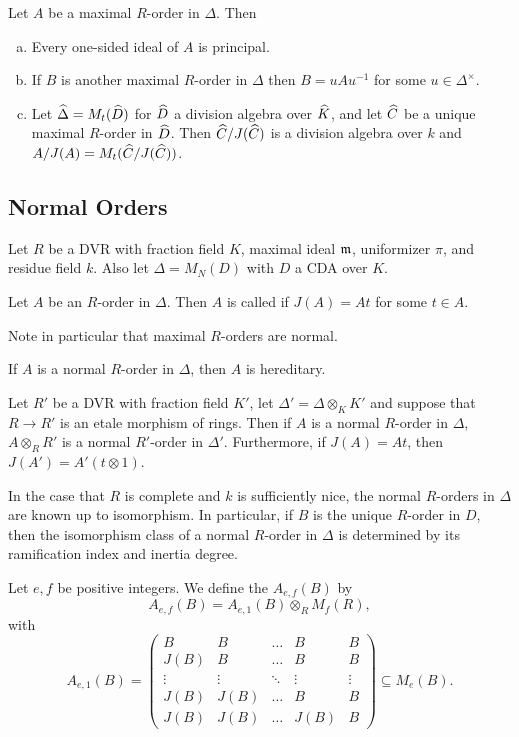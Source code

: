\begin{thm}
Let $A$ be a maximal $R$-order in $\Delta$.  Then
\begin{enumerate}[(a)]
\item  Every one-sided ideal of $A$ is principal.
\item  If $B$ is another maximal $R$-order in $\Delta$ then $B = uAu^{-1}$ for some $u\in \Delta^\times$.
\item  Let $\widehat\Delta = M_t(\widehat D)$ for $\widehat D$ a division algebra over $\widehat K$, and let $\widehat C$ be a unique maximal $R$-order in $\widehat D$.  Then $\widehat C/J(\widehat C)$ is a division algebra over $k$ and $A/J(A) = M_t(\widehat C/J(\widehat C))$.
\end{enumerate}
\end{thm}

\subsection{Normal Orders}
Let $R$ be a DVR with fraction field $K$, maximal ideal $\mathfrak{m}$, uniformizer $\pi$, and residue field $k$.  Also let $\Delta = M_N(D)$ with $D$ a CDA over $K$.
\begin{defn}
Let $A$ be an $R$-order in $\Delta$.  Then $A$ is called  if $J(A) = At$ for some $t\in A$.
\end{defn}
Note in particular that maximal $R$-orders are normal.
\begin{lem}
If $A$ is a normal $R$-order in $\Delta$, then $A$ is hereditary.
\end{lem}
\begin{lem}
Let $R'$ be a DVR with fraction field $K'$, let $\Delta' = \Delta\otimes_KK'$ and suppose that $R\rightarrow R'$ is an etale morphism of rings.  Then if $A$ is a normal $R$-order in $\Delta$, $A\otimes_R R'$ is a normal $R'$-order in $\Delta'$.  Furthermore, if $J(A) = At$, then $J(A') = A'(t\otimes 1)$.
\end{lem}
In the case that $R$ is complete and $k$ is sufficiently nice, the normal $R$-orders in $\Delta$ are known up to isomorphism.  In particular, if $B$ is the unique $R$-order in $D$, then the isomorphism class of a normal $R$-order in $\Delta$ is determined by its ramification index and inertia degree.
\begin{defn}
Let $e,f$ be positive integers.  We define the  $A_{e,f}(B)$ by
$$A_{e,f}(B)= A_{e,1}(B)\otimes_R M_f(R),$$ with
$$A_{e,1}(B)= \left(\begin{array}{ccccc}
B      &  B     & \dots  & B      & B\\
J(B)   &  B     & \dots  & B      & B\\
\vdots & \vdots & \ddots & \vdots & \vdots\\
J(B)   & J(B)   & \dots  & B      & B\\
J(B)   & J(B)   & \dots  & J(B)   & B
\end{array}\right)\subseteq M_e(B).$$
\end{defn}

